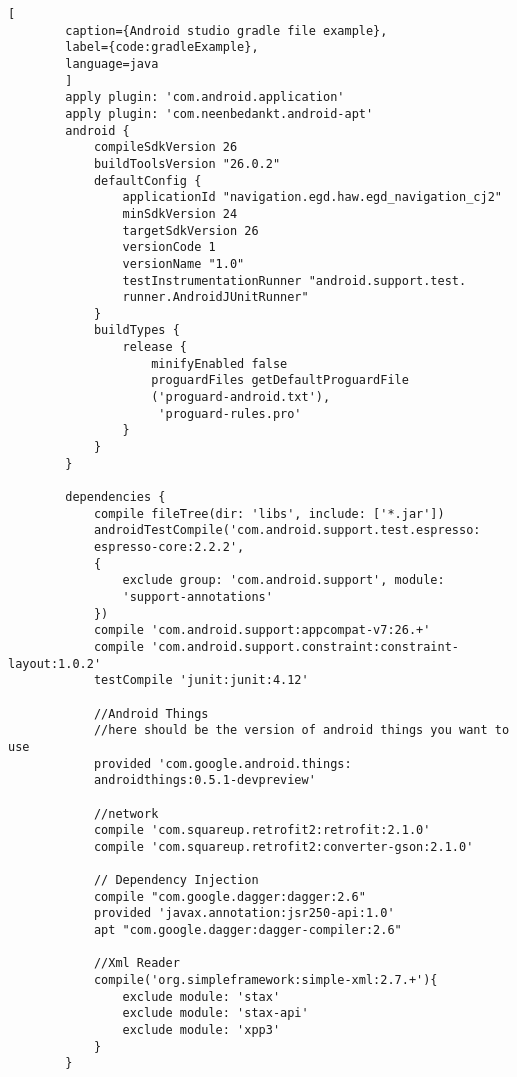     \newpage    
    \begin{lstlisting}[
        caption={Android studio gradle file example},
        label={code:gradleExample},
        language=java
        ]
        apply plugin: 'com.android.application'
        apply plugin: 'com.neenbedankt.android-apt'
        android {
            compileSdkVersion 26
            buildToolsVersion "26.0.2"
            defaultConfig {
                applicationId "navigation.egd.haw.egd_navigation_cj2"
                minSdkVersion 24
                targetSdkVersion 26
                versionCode 1
                versionName "1.0"
                testInstrumentationRunner "android.support.test.
                runner.AndroidJUnitRunner"
            }
            buildTypes {
                release {
                    minifyEnabled false
                    proguardFiles getDefaultProguardFile
                    ('proguard-android.txt'),
                     'proguard-rules.pro'
                }
            }
        }
        
        dependencies {
            compile fileTree(dir: 'libs', include: ['*.jar'])
            androidTestCompile('com.android.support.test.espresso:
            espresso-core:2.2.2', 
            {
                exclude group: 'com.android.support', module: 
                'support-annotations'
            })
            compile 'com.android.support:appcompat-v7:26.+'
            compile 'com.android.support.constraint:constraint-layout:1.0.2'
            testCompile 'junit:junit:4.12'
        
            //Android Things
            //here should be the version of android things you want to use
            provided 'com.google.android.things:
            androidthings:0.5.1-devpreview'
        
            //network
            compile 'com.squareup.retrofit2:retrofit:2.1.0'
            compile 'com.squareup.retrofit2:converter-gson:2.1.0'
        
            // Dependency Injection
            compile "com.google.dagger:dagger:2.6"
            provided 'javax.annotation:jsr250-api:1.0'
            apt "com.google.dagger:dagger-compiler:2.6"
        
            //Xml Reader
            compile('org.simpleframework:simple-xml:2.7.+'){
                exclude module: 'stax'
                exclude module: 'stax-api'
                exclude module: 'xpp3'
            }
        }
         
    \end{lstlisting} 
